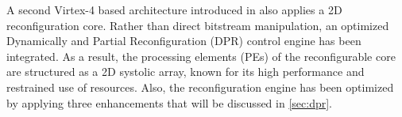 
A second Virtex-4 based architecture introduced in \cite{dpr} also applies a 2D reconfiguration core. Rather than direct bitstream manipulation, an optimized Dynamically and Partial Reconfiguration (DPR) control engine has been integrated. As a result, the processing elements (PEs) of the reconfigurable core are structured as a 2D systolic array, known for its high performance and restrained use of resources. Also, the reconfiguration engine has been optimized by applying three enhancements that will be discussed in \ref{sec:dpr}.